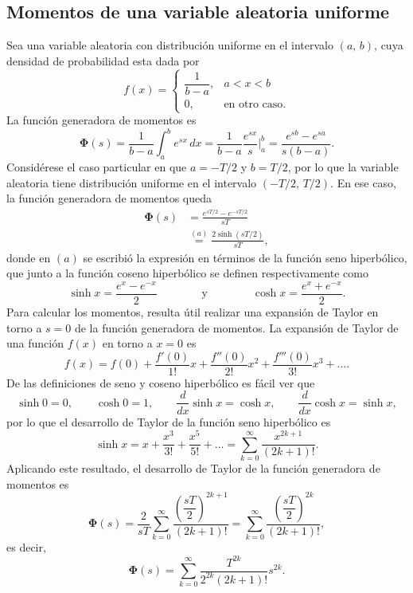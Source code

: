 \documentclass[a4paper]{report}
\newcommand{\Phibf}{\mathbf{\Phi}}
\begin{document}
\subsection{Momentos de una variable aleatoria uniforme}\label{sec:uniform_moments}

Sea una variable aleatoria con distribución uniforme en el intervalo \((a,\,b)\), cuya densidad de probabilidad esta dada por
\[
 f(x)=\left\{
 \begin{array}{ll}
  \dfrac{1}{b-a},& a<x<b\\
  0, &\textrm{en otro caso.}
 \end{array}
 \right.
\]
La función generadora de momentos es
\[
 \Phibf(s)=\frac{1}{b-a}\int_a^be^{sx}\,dx=\frac{1}{b-a}\frac{e^{sx}}{s}\bigg|_a^b=\frac{e^{sb}-e^{sa}}{s(b-a)}.
\]
Considérese el caso particular en que \(a=-T/2\) y \(b=T/2\), por lo que la variable aleatoria tiene distribución uniforme en el intervalo \((-T/2,\,T/2)\). En ese caso, la función generadora de momentos queda
\begin{align*}
 \Phibf(s)&=\frac{e^{sT/2}-e^{-sT/2}}{sT}\\
   &\overset{(a)}{=}\frac{2\sinh(sT/2)}{sT},
\end{align*}
donde en \((a)\) se escribió la expresión en términos de la función seno hiperbólico, que junto a la función coseno hiperbólico se definen respectivamente como
\[
 \sinh x=\frac{e^x-e^{-x}}{2}\qquad\qquad\textrm{y}\qquad\qquad\cosh x =\frac{e^x+e^{-x}}{2}.
\]
Para calcular los momentos, resulta útil realizar una expansión de Taylor en torno a \(s=0\) de la función generadora de momentos. La expansión de Taylor de una función \(f(x)\) en torno a \(x=0\) es
\[
 f(x)=f(0)+\frac{f'(0)}{1!}x+\frac{f''(0)}{2!}x^2+\frac{f'''(0)}{3!}x^3+\dots.
\]
De las definiciones de seno y coseno hiperbólico es fácil ver que
\[
 \sinh 0=0,\qquad\cosh0=1,\qquad\frac{d}{dx}\sinh x=\cosh x,\qquad\frac{d}{dx}\cosh x=\sinh x,
\]
por lo que el desarrollo de Taylor de la función seno hiperbólico es
\[
 \sinh x=x+\frac{x^3}{3!}+\frac{x^5}{5!}+\dots=\sum_{k=0}^\infty\frac{x^{2k+1}}{(2k+1)!}.
\]
Aplicando este resultado, el desarrollo de Taylor de la función generadora de momentos es
\[
 \Phibf(s)=\frac{2}{sT}\sum_{k=0}^\infty\frac{\left(\dfrac{sT}{2}\right)^{2k+1}}{(2k+1)!}
   =\sum_{k=0}^\infty\frac{\left(\dfrac{sT}{2}\right)^{2k}}{(2k+1)!},
\]
es decir,
\begin{equation}\label{eq:uniform_moment_generating_function_taylor}
 \Phibf(s)=\sum_{k=0}^\infty\frac{T^{2k}}{2^{2k}(2k+1)!}s^{2k}.
\end{equation}
\end{document}
